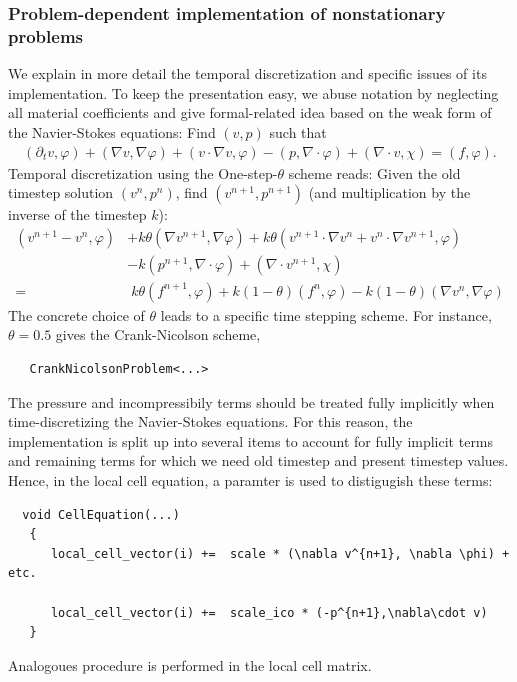 \documentclass[prodmode,acmtoms]{acmsmall}
\numberwithin{equation}{section}
\renewcommand{\phi}{\varphi}
\begin{document}
\subsubsection{Problem-dependent 
implementation of nonstationary problems}
\label{sec:timedep:implementation}
We explain in more detail the temporal discretization
and specific issues of its implementation. 
To keep the presentation easy, we abuse notation 
by neglecting
all material coefficients
and give formal-related idea based on the weak 
form of the Navier-Stokes equations:
Find $(v,p)$ such that
\begin{align*}
(\partial_t v,\phi) 
+ (\nabla v, \nabla \phi)
+ (v\cdot\nabla v,\phi)
-(p,\nabla\cdot \phi)
+(\nabla\cdot v, \chi)
=(f,\phi).
\end{align*}
Temporal discretization using the One-step-$\theta$ scheme reads:
Given the old timestep solution $(v^n,p^n)$, 
find $(v^{n+1}, p^{n+1})$ (and multiplication 
by the inverse of the timestep $k$):
\begin{align*}
(v^{n+1} - v^{n}, \phi)
&+ k\theta (\nabla v^{n+1}, \nabla \phi)
+ k\theta (v^{n+1}\cdot\nabla v^n + 
  v^{n}\cdot\nabla v^{n+1},\phi)\\
&- k (p^{n+1},\nabla\cdot \phi)
+ (\nabla\cdot v^{n+1}, \chi)\\
=&\; k\theta (f^{n+1},\phi) + k(1-\theta) (f^{n},\phi)
- k(1-\theta) (\nabla v^{n}, \nabla \phi) 
\end{align*}
The concrete choice of $\theta$ leads to a
specific time stepping scheme. For instance,
$\theta = 0.5$ gives the Crank-Nicolson scheme,
\begin{lstlisting}
   CrankNicolsonProblem<...>
\end{lstlisting}


The pressure and incompressibily terms should be 
treated fully implicitly when time-discretizing 
the Navier-Stokes equations.
For this reason, the implementation is split up
into several items to account for fully implicit 
terms and remaining terms for which we need 
old timestep and present timestep values. 
Hence, in the local cell equation, a paramter
is used to distigugish these terms:
\begin{lstlisting}
  void CellEquation(...)
   {
      local_cell_vector(i) +=  scale * (\nabla v^{n+1}, \nabla \phi) + etc.

      local_cell_vector(i) +=  scale_ico * (-p^{n+1},\nabla\cdot v)
   }
\end{lstlisting}
Analogoues procedure is performed in the local 
cell matrix.
\end{document}
